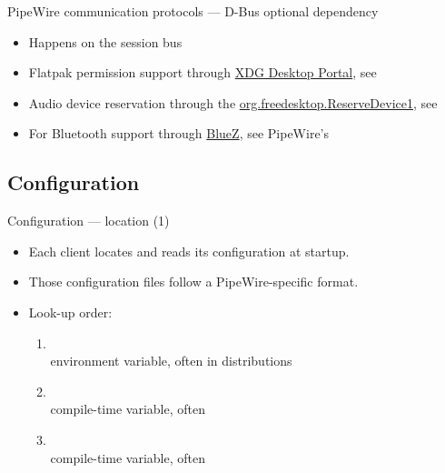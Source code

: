 \begin{frame}{PipeWire communication protocols — D-Bus optional dependency}
  \begin{itemize}

  \item Happens on the session bus
  \item Flatpak permission support through
    \href{https://docs.flatpak.org/en/latest/desktop-integration.html\#portals}{
    XDG Desktop Portal}, see 
  \item Audio device reservation through the
    \href{https://git.0pointer.net/reserve.git/tree/reserve.txt}{
    org.freedesktop.ReserveDevice1}, see
  \item For Bluetooth support through
    \href{https://www.bluez.org/}{BlueZ}, see PipeWire's

  \end{itemize}
\end{frame}



\subsection{Configuration}



\begin{frame}{Configuration — location (1)}
  \begin{itemize}

  \item Each client locates and reads its configuration at startup.

  \item Those configuration files follow a PipeWire-specific format.

  \item Look-up order:
    \begin{enumerate}
    \item {}\\
      environment variable, often  in distributions
    \item {}\\
      compile-time variable, often 
    \item {}\\
      compile-time variable, often 
    \end{enumerate}

  \end{itemize}
\end{frame}



